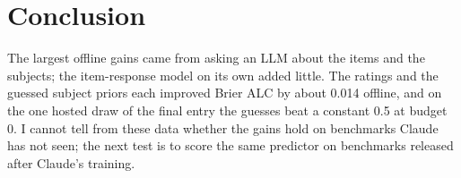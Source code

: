 \section{Conclusion}\label{sec:conclusion}

The largest offline gains came from asking an LLM about the items and the subjects; the item-response model on its own added little. The ratings and the guessed subject priors each improved Brier ALC by about 0.014 offline, and on the one hosted draw of the final entry the guesses beat a constant 0.5 at budget 0. I cannot tell from these data whether the gains hold on benchmarks Claude has not seen; the next test is to score the same predictor on benchmarks released after Claude's training.
